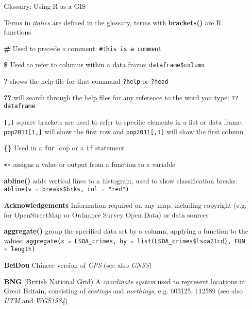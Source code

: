\documentclass[a4paper,10pt]{article}
\begin{document}

\begin{center}

{\huge Glossary: Using R as a GIS}

Terms in \textit{italics} are defined in the glossary, terms with \textbf{brackets()} are R functions

\end{center}

\begin{multicols}{2}

\textbf{\#} Used to precede a comment: \texttt{\#this is a comment}

\textbf{\$} Used to refer to columns within a data frame: \texttt{dataframe\$column} 

\textbf{?} shows the help file for that command \texttt{?help} or \texttt{?head}

\textbf{??} will search through the help files for any reference to the word you type: \texttt{??dataframe}

\textbf{\texttt{[,]}} square brackets are used to refer to specific elements in a list or data frame. \texttt{pop2011[1,]} will show the first row and \texttt{pop2011[,1]} will show the first column

\textbf{\{\}} Used in a \texttt{for} loop or a \texttt{if} statement

\textbf{\texttt{<-}} assigns a value or output from a function to a variable

\textbf{abline()} adds vertical lines to a histogram, used to show classification breaks: \texttt{abline(v = breaks\$brks, col = "red")}

\textbf{Acknowledgements} Information required on any map, including copyright (e.g. for OpenStreetMap or Ordnance Survey Open Data) or data sources 

\textbf{aggregate()} group the specified data set by a column, applying a function to the values: \texttt{aggregate(x = LSOA\_crimes, by = list(LSOA\_crimes\$lsoa21cd), FUN = length)}

\textbf{BeiDou} Chinese version of \textit{GPS} (see also \textit{GNSS})

\textbf{BNG} (British National Grid) A \textit{coordinate system} used to represent locations in Great Britain, consisting of \textit{eastings} and \textit{northings}, e.g. 603125, 112589 (see also \textit{UTM} and \textit{WGS1984}) 


\end{multicols}
\end{document}
